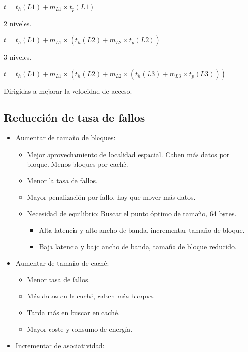 \documentclass[12pt, twoside, openright]{report} %
\begin{document}
$t = t_h(L1) + m_{L1} \times t_p(L1)$

2 niveles.

$t = t_h(L1) + m_{L1} \times (t_h(L2) + m_{L2} \times t_p(L2))$

3 niveles.

$t = t_h(L1)+m_{L1}\times(t_h(L2) + m_{L2} \times (t_h(L3) + m_{L3} \times t_p(L3)))$

Dirigidas a mejorar la velocidad de acceso.

\subsection{Reducción de tasa de fallos}

\begin{itemize}

	\item Aumentar de tamaño de bloques:

	      \begin{itemize}

		      \item Mejor aprovechamiento de localidad espacial. Caben más datos por
		            bloque. Menos bloques por caché.
		      \item Menor la tasa de fallos.
		      \item Mayor penalización por fallo, hay que mover más datos.
		      \item Necesidad de equilibrio: Buscar el punto óptimo de tamaño, 64
		            bytes.

		            \begin{itemize}

			            \item Alta latencia y alto ancho de banda, incrementar tamaño de
			                  bloque.
			            \item Baja latencia y bajo ancho de banda, tamaño de bloque reducido.
		            \end{itemize}
	      \end{itemize}
	\item Aumentar de tamaño de caché:

	      \begin{itemize}

		      \item Menor tasa de fallos.
		      \item Más datos en la caché, caben más bloques.
		      \item Tarda más en buscar en caché.
		      \item Mayor coste y consumo de energía.
	      \end{itemize}
	\item Incrementar de asociatividad:


\end{itemize}
\end{document}
